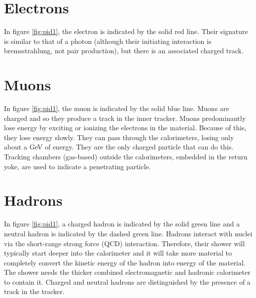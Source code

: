 \section{Electrons}
In figure \ref{fig:pid1}, the electron is indicated by the solid red line. Their signature is similar to that of a photon (although their initiating interaction is bremsstrahlung, not pair production), but there is an associated charged track.
\section{Muons}
In figure \ref{fig:pid1}, the muon is indicated by the solid blue line. Muons are charged and so they produce a track in the inner tracker. Muons predominantly lose energy by exciting or ionizing the electrons in the material. Because of this, they lose energy slowly. They can pass through the calorimeters, losing only about a GeV of energy.  They are the only charged particle that can do this.  Tracking chambers (gas-based) outside the calorimeters, embedded in the return yoke, are used to indicate a penetrating particle.
\section{Hadrons}
In figure \ref{fig:pid1}, a charged hadron is indicated by the solid green line and a neutral hadron is indicated by the dashed green line. Hadrons interact with nuclei via the short-range strong force (QCD) interaction. Therefore, their shower will typically start deeper into the calorimeter and it will take more material to completely convert the kinetic energy of the hadron into energy of the material. The shower needs the thicker combined electromagnetic and hadronic calorimeter to contain it. Charged and neutral hadrons are distinguished by the presence of a track in the tracker.
